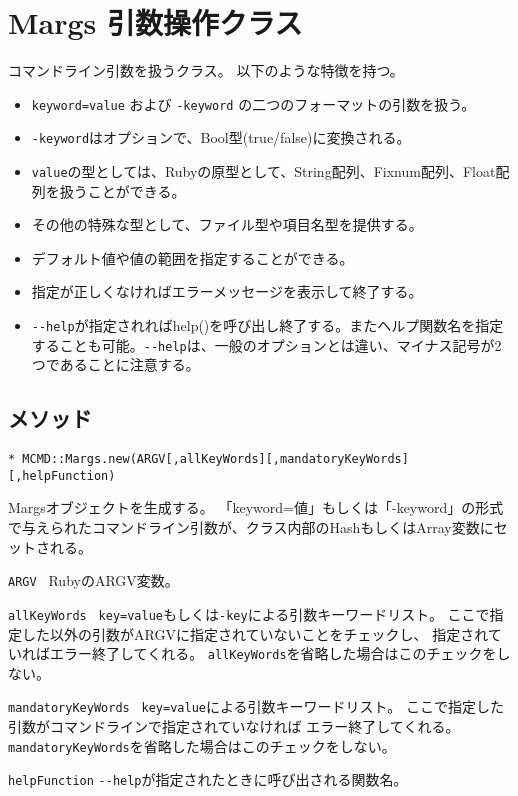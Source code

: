 
%

\section{Margs 引数操作クラス\label{sect:margsRB}}
コマンドライン引数を扱うクラス。
以下のような特徴を持つ。
\begin{itemize}
	\setlength{\itemindent}{-5mm}
	\item \verb|keyword=value| および \verb|-keyword| の二つのフォーマットの引数を扱う。
	\item \verb|-keyword|はオプションで、Bool型(true/false)に変換される。
	\item \verb|value|の型としては、Rubyの原型として、String配列、Fixnum配列、Float配列を扱うことができる。
	\item その他の特殊な型として、ファイル型や項目名型を提供する。
	\item デフォルト値や値の範囲を指定することができる。
	\item 指定が正しくなければエラーメッセージを表示して終了する。
	\item \verb|--help|が指定されればhelp()を呼び出し終了する。またヘルプ関数名を指定することも可能。\verb|--help|は、一般のオプションとは違い、マイナス記号が2つであることに注意する。
\end{itemize}

\subsection{メソッド}

{\Large
\begin{verbatim}
* MCMD::Margs.new(ARGV[,allKeyWords][,mandatoryKeyWords][,helpFunction)
\end{verbatim}
}

Margsオブジェクトを生成する。
「keyword=値」もしくは「-keyword」の形式で与えられたコマンドライン引数が、クラス内部のHashもしくはArray変数にセットされる。

\begin{description}
	\setlength{\itemindent}{-5mm}
	\item {\large \verb/ARGV /} RubyのARGV変数。
	\item {\large \verb/allKeyWords /} \verb/key=value/もしくは\verb/-key/による引数キーワードリスト。
	                   ここで指定した以外の引数がARGVに指定されていないことをチェックし、
	                   指定されていればエラー終了してくれる。
	                   \verb/allKeyWords/を省略した場合はこのチェックをしない。
	\item {\large \verb/mandatoryKeyWords /} \verb/key=value/による引数キーワードリスト。
	                         ここで指定した引数がコマンドラインで指定されていなければ
	                         エラー終了してくれる。
	                         \verb/mandatoryKeyWords/を省略した場合はこのチェックをしない。
	\item {\large \verb/helpFunction/} \verb/--help/が指定されたときに呼び出される関数名。

\end{description}

